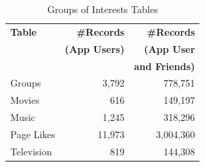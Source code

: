 \begin{table}
\centering
\caption{\small Groups of Interests Tables}
\label{tab:interests}
\begin{tabular}{|>{\small}p{2cm}|>{\small}r|>{\small}r|}
\hline
\textbf{Table} & \textbf{\#Records} & \textbf{\#Records} \\
& \textbf{(App Users)} & \textbf{(App User} \\
& & \textbf{and Friends)} \\
\hline
Groups & 3,792 & 778,751 \\
\hline
Movies & 616 & 149,197 \\
\hline
Music & 1,245 & 318,296 \\
\hline
Page Likes & 11,973 & 3,004,360 \\
\hline
Television & 819 & 144,308 \\
\hline
\end{tabular}
\end{table}





